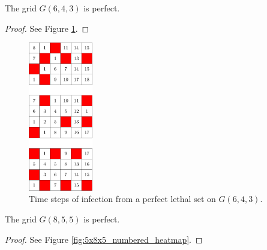 \begin{con}
\label{con:6x4x3}
The grid $G(6,4,3)$ is perfect.
\end{con}

\begin{proof}
See Figure \ref{fig:4x6x3_numbered_heatmap}.
\end{proof}

\begin{figure}[H]
\centering
\includegraphics[width=0.25\textwidth]{figures/A/4x6x3_numbered_heatmap.pdf}
\caption{Time steps of infection from a perfect lethal set on $G(6,4,3)$.}
\label{fig:4x6x3_numbered_heatmap}
\end{figure}

\newpage




\begin{con}
\label{con:8x5x5}
The grid $G(8,5,5)$ is perfect.
\end{con}

\begin{proof}
See Figure \ref{fig:5x8x5_numbered_heatmap}.
\end{proof}

